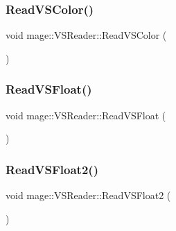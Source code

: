 \hypertarget{classmage_1_1_v_s_reader_a42bdfc1fcc6f385e0f88820491d53e04}{}\label{classmage_1_1_v_s_reader_a42bdfc1fcc6f385e0f88820491d53e04} 
\subsubsection{\texorpdfstring{Read\+V\+S\+Color()}{ReadVSColor()}}
{\footnotesize\ttfamily void mage\+::\+V\+S\+Reader\+::\+Read\+V\+S\+Color (\begin{DoxyParamCaption}{ }\end{DoxyParamCaption})\hspace{0.3cm}{\ttfamily [private]}}

\hypertarget{classmage_1_1_v_s_reader_a64c525d3d87ed248424e4eba359d9ecf}{}\label{classmage_1_1_v_s_reader_a64c525d3d87ed248424e4eba359d9ecf} 
\subsubsection{\texorpdfstring{Read\+V\+S\+Float()}{ReadVSFloat()}}
{\footnotesize\ttfamily void mage\+::\+V\+S\+Reader\+::\+Read\+V\+S\+Float (\begin{DoxyParamCaption}{ }\end{DoxyParamCaption})\hspace{0.3cm}{\ttfamily [private]}}

\hypertarget{classmage_1_1_v_s_reader_a18c7821c219354d84f0071a5bfa8651c}{}\label{classmage_1_1_v_s_reader_a18c7821c219354d84f0071a5bfa8651c} 
\subsubsection{\texorpdfstring{Read\+V\+S\+Float2()}{ReadVSFloat2()}}
{\footnotesize\ttfamily void mage\+::\+V\+S\+Reader\+::\+Read\+V\+S\+Float2 (\begin{DoxyParamCaption}{ }\end{DoxyParamCaption})\hspace{0.3cm}{\ttfamily [private]}}

